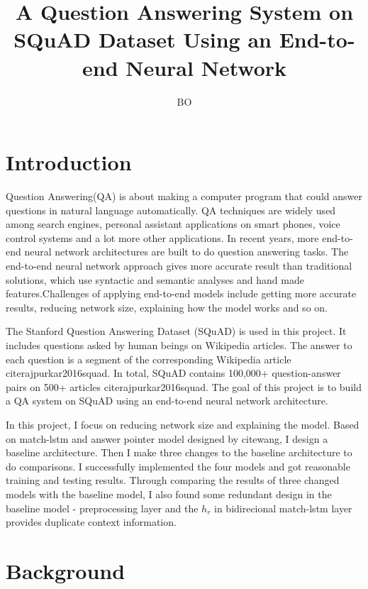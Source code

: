 \documentclass[modernstyle,12pt]{sjsuthesis}
\title{A Question Answering System on SQuAD Dataset Using an End-to-end Neural Network}
\author{BO}{LI}
\theoremstyle{definition}
\begin{document}
\raggedright          %
\parindent=30pt       %




\chapter{Introduction}

Question Answering(QA) is about making a computer program that could answer questions in natural language automatically. QA techniques are widely used among search engines, personal assistant applications on smart phones, voice control systems and a lot more other applications. In recent years, more end-to-end neural network architectures are built to do question answering tasks. The end-to-end neural network approach gives more accurate result than traditional solutions, which use syntactic and semantic analyses and hand made features.Challenges of applying end-to-end models include getting more accurate results, reducing network size, explaining how the model works and so on.

The Stanford Question Answering Dataset (SQuAD) is used in this project. It includes questions asked by human beings on Wikipedia articles. The answer to each question is a segment of the corresponding Wikipedia article cite{rajpurkar2016squad}. In total, SQuAD contains 100,000+ question-answer pairs on 500+ articles cite{rajpurkar2016squad}. The goal of this project is to build a QA system on SQuAD using an end-to-end neural network architecture.

In this project, I focus on reducing network size and explaining the model. Based on match-lstm and answer pointer model designed by citewang, I design a baseline architecture. Then I make three changes to the baseline architecture to do comparisons. I successfully implemented the four models and got reasonable training and testing results. Through comparing the results of three changed models with the baseline model, I also found some redundant design in the baseline model - preprocessing layer and the $h_r$ in bidirecional match-lstm layer provides duplicate context information.



\chapter{Background}
\end{document}
